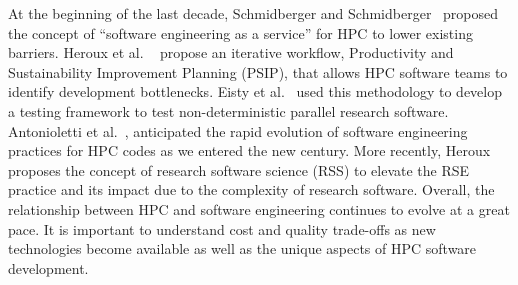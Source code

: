 At the beginning of the last decade, Schmidberger and Schmidberger~\cite{6341491} proposed the concept of ``software engineering as a service'' for HPC to lower existing barriers. Heroux et al.
~\cite{10.1007/978-3-030-44728-1_6} propose an iterative workflow, Productivity and Sustainability Improvement Planning (PSIP), that allows HPC software teams to identify development bottlenecks. Eisty et al.~\cite{10.1007/978-3-030-50436-6_33} used this methodology to develop a testing framework to test non-deterministic parallel research software.
Antonioletti et al.~\cite{antonioletti2000software}, anticipated the rapid evolution of software engineering practices for HPC codes as we entered the new century. More recently, Heroux~\cite{10078171} proposes the concept of research software science (RSS) to elevate the RSE practice and its impact due to the complexity of research software. 
Overall, the relationship between HPC and software engineering continues to evolve at a great pace.
It is important to understand cost and quality trade-offs as new technologies become available as well as the unique aspects of HPC software development.
